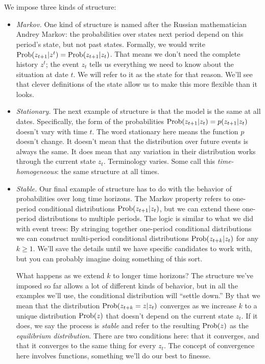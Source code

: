 \documentclass[11pt]{article}
\begin{document}
We impose three kinds of structure:
%
\begin{itemize}
\item {\it Markov.\/}  One kind of structure is named after the Russian
mathematician Andrey Markov:
the probabilities over states next period
depend on this period's state, but not past states.
Formally, we would write
$\mbox{Prob}(z_{t+1} | z^t ) = \mbox{Prob}(z_{t+1} | z_t ) $.
That means we don't need the complete history $z^t$;
the event $z_t$ tells us everything we need to know
about the situation at date $t$.
We will refer to it as the state for that reason.
We'll see that clever definitions of the state allow us to make this
more flexible than it looks.

\item {\it Stationary.\/}
The next example of structure is that the model is the same at all dates.
Specifically,  the form of the probabilities $\mbox{Prob}(z_{t+1} | z_t) = p(z_{t+1} | z_t) $
doesn't vary with time $t$.
The word stationary here means the function $p$ doesn't change.
It doesn't mean that the distribution over future events is always the same.
It does mean that any variation in their distribution
works through the current state $z_t$.
Terminology varies.  Some call this {\it time-homogeneous\/}:
the same structure at all times.


\item {\it Stable.\/}
Our final example of structure has to do with the behavior of probabilities
over long time horizons.
The Markov property refers to one-period conditional distributions
 $\mbox{Prob}(z_{t+1} | z_t) $,
but we can extend these one-period distributions to multiple periods.
The logic is similar to what we did with event trees:
By stringing together one-period conditional distributions
we can construct multi-period conditional distributions
$\mbox{Prob}(z_{t+k} | z_t) $ for any $k \geq 1$.
We'll save the details until we have specific candidates to work
with, but you can probably imagine doing something of this sort.


What happens as we extend $k$ to longer time horizons?
The structure we've imposed so far allows a lot of different kinds
of behavior, but in all the examples we'll use,
the conditional distribution will ``settle down.''
By that we mean that the distribution $ \mbox{Prob}(z_{t+k} = z | z_t) $
converges as we increase $k$ to a unique distribution $\mbox{Prob}(z)$
that doesn't depend on the current state $z_t$.
If it does, we say the process is {\it stable\/}
and refer to the resulting $\mbox{Prob}(z)$ as the
{\it equilibrium distribution\/}.
There are two conditions here:  that it converges, and that it converges
to the same thing for every $z_t$.
The concept of convergence here involves functions, something we'll do our best to finesse.


\end{itemize}
\end{document}
